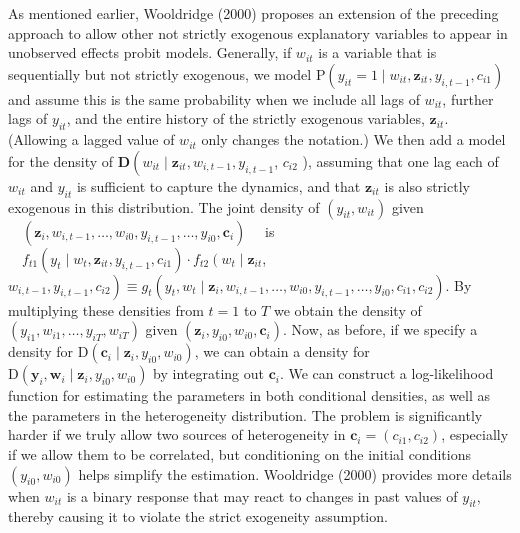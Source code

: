 \documentclass[10pt]{article}
\begin{document}
As mentioned earlier, Wooldridge (2000) proposes an extension of the preceding approach to allow other not strictly exogenous explanatory variables to appear in unobserved effects probit models. Generally, if $w_{i t}$ is a variable that is sequentially but not strictly exogenous, we model $\mathrm{P}\left(y_{i t}=1 \mid w_{i t}, \mathbf{z}_{i t}, y_{i, t-1}, c_{i 1}\right)$ and assume this is the same probability when we include all lags of $w_{i t}$, further lags of $y_{i t}$, and the entire history of the strictly exogenous variables, $\mathbf{z}_{i t}$. (Allowing a lagged value of $w_{i t}$ only changes the notation.) We then add a model for the density of $\mathbf{D}\left(w_{i t} \mid \mathbf{z}_{i t}, w_{i, t-1}, y_{i, t-1}\right.$, $c_{i 2}$ ), assuming that one lag each of $w_{i t}$ and $y_{i t}$ is sufficient to capture the dynamics, and that $\mathbf{z}_{i t}$ is also strictly exogenous in this distribution. The joint density of $\left(y_{i t}, w_{i t}\right)$ given $\quad\left(\mathbf{z}_{i}, w_{i, t-1}, \ldots, w_{i 0}, y_{i, t-1}, \ldots, y_{i 0}, \mathbf{c}_{i}\right) \quad$ is $\quad f_{t 1}\left(y_{t} \mid w_{t}, \mathbf{z}_{i t}, y_{i, t-1}, c_{i 1}\right) \cdot f_{t 2}\left(w_{t} \mid \mathbf{z}_{i t}\right.$, $\left.w_{i, t-1}, y_{i, t-1}, c_{i 2}\right) \equiv g_{t}\left(y_{t}, w_{t} \mid \mathbf{z}_{i}, w_{i, t-1}, \ldots, w_{i 0}, y_{i, t-1}, \ldots, y_{i 0}, c_{i 1}, c_{i 2}\right)$. By multiplying these densities from $t=1$ to $T$ we obtain the density of $\left(y_{i 1}, w_{i 1}, \ldots, y_{i T}, w_{i T}\right)$ given $\left(\mathbf{z}_{i}, y_{i 0}, w_{i 0}, \mathbf{c}_{i}\right)$. Now, as before, if we specify a density for $\mathrm{D}\left(\mathbf{c}_{i} \mid \mathbf{z}_{i}, y_{i 0}, w_{i 0}\right)$, we can obtain a density for $\mathrm{D}\left(\mathbf{y}_{i}, \mathbf{w}_{i} \mid \mathbf{z}_{i}, y_{i 0}, w_{i 0}\right)$ by integrating out $\mathbf{c}_{i}$. We can construct a log-likelihood function for estimating the parameters in both conditional densities, as well as the parameters in the heterogeneity distribution. The problem is significantly harder if we truly allow two sources of heterogeneity in $\mathbf{c}_{i}=\left(c_{i 1}, c_{i 2}\right)$, especially if we allow them to be correlated, but conditioning on the initial conditions $\left(y_{i 0}, w_{i 0}\right)$ helps simplify the estimation. Wooldridge (2000) provides more details when $w_{i t}$ is a binary response that may react to changes in past values of $y_{i t}$, thereby causing it to violate the strict exogeneity assumption.
\end{document}
